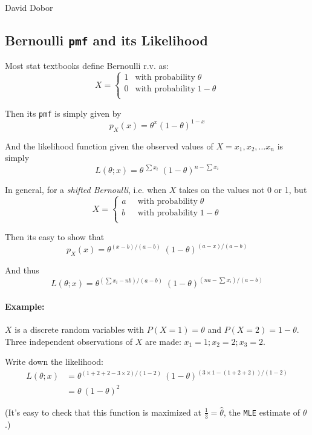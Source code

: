 \documentclass[12pt]{article}
\begin{document}
\begin{center} 
               David Dobor 
\end{center} 

\begin{center} 
               \section*{Bernoulli \texttt{pmf} and its Likelihood}
\end{center} 
Most stat textbooks define Bernoulli r.v. as:
\[
X = 
\begin{cases}
  1  & \text{with probability} \; \theta \\
  0  & \text{with probability} \; 1 - \theta \\
\end{cases}
\]


Then its \texttt{pmf} is simply given by 
$$
p_X (x) = \theta^x (1 - \theta)^{1 - x}
$$

And the likelihood function given the observed values of $X = {x_1, x_2, \dots x_n}$ is simply
$$
L(\theta ; x ) = \theta^{\ \sum x_i} \; (1 - \theta)^{n - \sum x_i}
$$

In general, for a \emph{shifted Bernoulli}, i.e. when $X$ takes on the values not 0 or 1, but 
$$
X = 
\begin{cases}
  a & \; \; \text{with probability} \; \theta \\
  b & \; \; \text{with probability} \; 1 - \theta \\
\end{cases}
$$


Then its easy to show that 
$$
p_X (x) = \theta^{(x - b)/(a - b)} \; (1 - \theta)^{(a - x) / (a - b)}
$$

And thus 
$$
L(\theta ; x ) = \theta^{(\sum x_i - nb) / (a -b)} \; (1 - \theta)^{(na - \sum x_i) / (a -b)}
$$

\paragraph{Example:}
 $X$ is a discrete random variables with $P(X = 1) = \theta$ and $P(X =
2) = 1 -\theta$. Three independent observations of $X$ are made: $x_1 = 1;  x_2 = 2;  x_3 = 2$.

Write down the likelihood:
\begin{align*}
L(\theta ; x ) & = \theta^{(1 + 2 + 2 - 3 \times 2) / (1 -2)}  \ (1 - \theta)^{(3 \times 1 - (1 + 2 + 2)) / (1 - 2)} \\
&= \theta  \ (1 - \theta)^2
\end{align*}

(It's easy to check that this function is maximized at $\frac{1}{3}  = \hat \theta$, the \texttt{MLE} estimate of $\theta$.)
\end{document}
